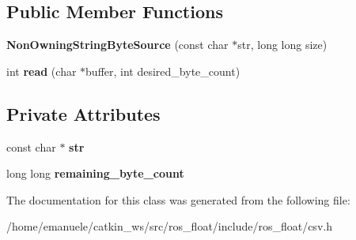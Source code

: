 \subsection*{Public Member Functions}
\begin{DoxyCompactItemize}
\item 
\mbox{\label{classio_1_1detail_1_1NonOwningStringByteSource_a8fd604017b38e20f90386b6e10bd95a3}} 
{\bfseries Non\+Owning\+String\+Byte\+Source} (const char $\ast$str, long long size)
\item 
\mbox{\label{classio_1_1detail_1_1NonOwningStringByteSource_aba194be7e3a141f40d683db483a620bb}} 
int {\bfseries read} (char $\ast$buffer, int desired\+\_\+byte\+\_\+count)
\end{DoxyCompactItemize}
\subsection*{Private Attributes}
\begin{DoxyCompactItemize}
\item 
\mbox{\label{classio_1_1detail_1_1NonOwningStringByteSource_ad130b4796eb5758c3e512d585af51bef}} 
const char $\ast$ {\bfseries str}
\item 
\mbox{\label{classio_1_1detail_1_1NonOwningStringByteSource_aa2097ba0c3c49f0266ec1fbc8f322947}} 
long long {\bfseries remaining\+\_\+byte\+\_\+count}
\end{DoxyCompactItemize}


The documentation for this class was generated from the following file\+:\begin{DoxyCompactItemize}
\item 
/home/emanuele/catkin\+\_\+ws/src/ros\+\_\+float/include/ros\+\_\+float/csv.\+h\end{DoxyCompactItemize}
